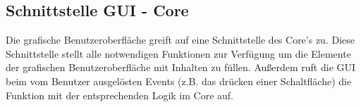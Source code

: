 \subsection{Schnittstelle GUI - Core}
Die grafische Benutzeroberfläche greift auf eine Schnittstelle des Core's zu. Diese Schnittstelle stellt alle notwendigen Funktionen zur Verfügung um die Elemente der grafischen Benutzeroberfläche mit Inhalten zu füllen. Außerdem ruft die GUI beim vom Benutzer ausgelösten Events (z.B. das drücken einer Schaltfläche) die Funktion mit der entsprechenden Logik im Core auf.


